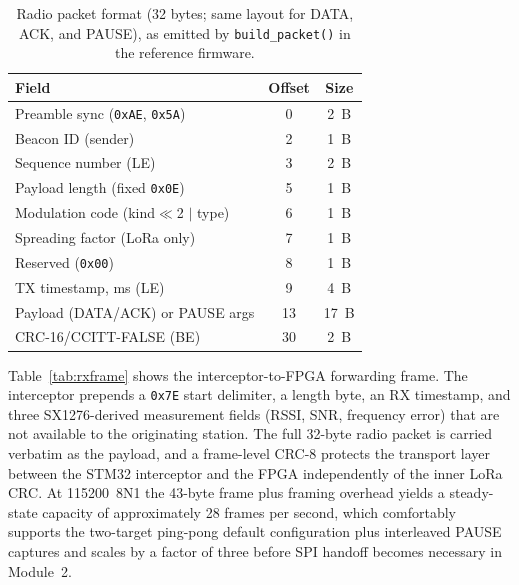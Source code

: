 \documentclass[conference]{IEEEtran}
\begin{document}
\begin{table}[t]
\centering
\caption{Radio packet format (32 bytes; same layout for DATA, ACK, and PAUSE), as emitted by \texttt{build\_packet()} in the reference firmware.}
\label{tab:beaconframe}
\begin{tabular}{l c c}
\toprule
\textbf{Field} & \textbf{Offset} & \textbf{Size} \\
\midrule
Preamble sync (\texttt{0xAE}, \texttt{0x5A}) & 0  & 2~B \\
Beacon ID (sender)              & 2  & 1~B \\
Sequence number (LE)            & 3  & 2~B \\
Payload length (fixed \texttt{0x0E})    & 5  & 1~B \\
Modulation code (kind$\ll$2 $|$ type) & 6 & 1~B \\
Spreading factor (LoRa only)    & 7  & 1~B \\
Reserved (\texttt{0x00})        & 8  & 1~B \\
TX timestamp, ms (LE)           & 9  & 4~B \\
Payload (DATA/ACK) or PAUSE args & 13 & 17~B \\
CRC-16/CCITT-FALSE (BE)         & 30 & 2~B \\
\bottomrule
\end{tabular}
\end{table}

Table~\ref{tab:rxframe} shows the interceptor-to-FPGA forwarding frame. The interceptor prepends a \texttt{0x7E} start delimiter, a length byte, an RX timestamp, and three SX1276-derived measurement fields (RSSI, SNR, frequency error) that are not available to the originating station. The full 32-byte radio packet is carried verbatim as the payload, and a frame-level CRC-8 protects the transport layer between the STM32 interceptor and the FPGA independently of the inner LoRa CRC. At 115200~8N1 the 43-byte frame plus framing overhead yields a steady-state capacity of approximately 28 frames per second, which comfortably supports the two-target ping-pong default configuration plus interleaved PAUSE captures and scales by a factor of three before SPI handoff becomes necessary in Module~2.
\end{document}
